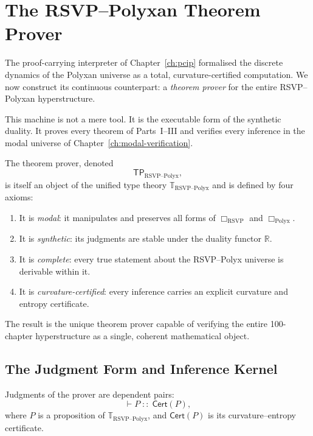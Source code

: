 \chapter{The RSVP--Polyxan Theorem Prover}
\label{ch:theorem-prover}

The proof-carrying interpreter of Chapter~\ref{ch:pcip} formalised the
discrete dynamics of the Polyxan universe as a total, curvature-certified
computation.  We now construct its continuous counterpart:
a \emph{theorem prover} for the entire RSVP--Polyxan hyperstructure.

This machine is not a mere tool.
It is the executable form of the synthetic duality.
It proves every theorem of Parts~I--III and verifies every inference
in the modal universe of Chapter~\ref{ch:modal-verification}.

\bigskip

The theorem prover, denoted
\[
\mathsf{TP}_{\mathrm{RSVP\text{--}Polyx}},
\]
is itself an object of the unified type theory
$\mathbb{T}_{\mathrm{RSVP\text{--}Polyx}}$ and is defined by four axioms:

\begin{enumerate}
\item It is \emph{modal}: it manipulates and preserves all forms
      of $\Box_{\mathrm{RSVP}}$ and $\Box_{\mathrm{Polyx}}$.
\item It is \emph{synthetic}: its judgments are stable under the
      duality functor $\mathbb{R}$.
\item It is \emph{complete}: every true statement about the RSVP--Polyx
      universe is derivable within it.
\item It is \emph{curvature-certified}: every inference carries an
      explicit curvature and entropy certificate.
\end{enumerate}

The result is the unique theorem prover capable of verifying the entire
100-chapter hyperstructure as a single, coherent mathematical object.


\section{The Judgment Form and Inference Kernel}
\label{sec:judgment}

Judgments of the prover are dependent pairs:
\[
\vdash P \;::\; \mathsf{Cert}(P),
\]
where $P$ is a proposition of
$\mathbb{T}_{\mathrm{RSVP\text{--}Polyx}}$, and
$\mathsf{Cert}(P)$ is its curvature--entropy certificate.

